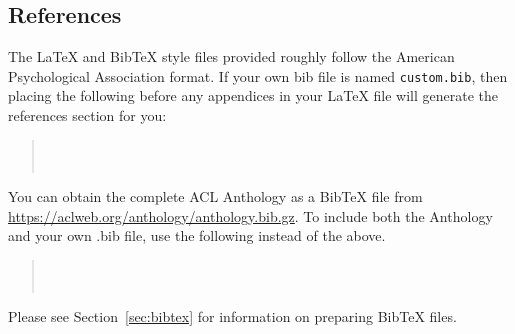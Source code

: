 \subsection{References}

\nocite{Ando2005,borschinger-johnson-2011-particle,andrew2007scalable,rasooli-tetrault-2015,goodman-etal-2016-noise,harper-2014-learning}

The \LaTeX{} and Bib\TeX{} style files provided roughly follow the American Psychological Association format.
If your own bib file is named \texttt{custom.bib}, then placing the following before any appendices in your \LaTeX{} file will generate the references section for you:
\begin{quote}
	\begin{verbatim}
		
		
	\end{verbatim}
\end{quote}

You can obtain the complete ACL Anthology as a Bib\TeX{} file from \url{https://aclweb.org/anthology/anthology.bib.gz}.
To include both the Anthology and your own .bib file, use the following instead of the above.
\begin{quote}
	\begin{verbatim}
		
		
	\end{verbatim}
\end{quote}

Please see Section~\ref{sec:bibtex} for information on preparing Bib\TeX{} files.

